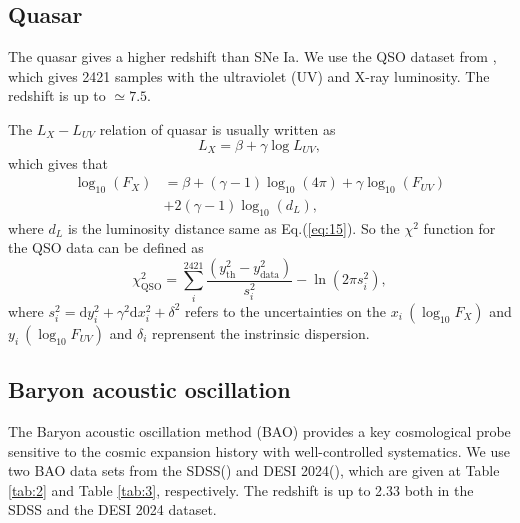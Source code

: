 \documentclass[twocolumn]{aastex631}
\begin{document}
\subsection{Quasar}

   The quasar gives a higher redshift than SNe Ia.
   We use the QSO dataset from \cite{Lusso_2020}, which gives
   2421 samples with the ultraviolet (UV) and X-ray luminosity.
   The redshift is up to $\simeq7.5$.

   The $L_X-L_{UV}$ relation of quasar is usually written as
   \begin{equation}
      L_X=\beta+\gamma\log L_{UV},
   \end{equation}
   which gives that
   \begin{eqnarray}
      \nonumber\log_{10}(F_X)&=\beta+(\gamma-1)\log_{10}(4\pi)+\gamma\log_{10}(F_{UV})
                    \\ &+2(\gamma-1)\log_{10}(d_L),
   \end{eqnarray}
   where $d_L$ is the luminosity distance same as Eq.(\ref{eq:15}).
   So the $\chi^2$ function for the QSO data can be defined as
   \begin{equation}
      \chi_{\text{QSO}}^2=\sum_i^{2421}\frac{(y_{\text{th}}^2-y_{\text{data}}^2)}{s_i^2}
      -\ln(2\pi s_i^2),
   \end{equation}
   where $s_i^2=\mathrm{d}y_i^2+\gamma^2\mathrm{d}x_i^2+\delta^2$ refers to the 
   uncertainties on the $x_i\ (\log_{10}F_X)$ and $y_i\ (\log_{10}F_{UV})$ and
   $\delta_i$ reprensent the instrinsic dispersion.

\subsection{Baryon acoustic oscillation}

   The Baryon acoustic oscillation method (BAO) provides a key cosmological probe
   sensitive to the cosmic expansion history with well-controlled systematics.
   We use two BAO data sets from the SDSS(\cite{PhysRevD.103.083533}) and DESI 2024(\cite{desicollaboration2024desi2024vicosmological}),
   which are given at Table \ref{tab:2} and Table \ref{tab:3}, respectively.
   The redshift is up to 2.33 both in the SDSS and the DESI 2024 dataset.
\end{document}
